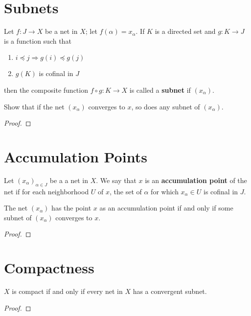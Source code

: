 \documentclass[12pt]{article}
\begin{document}
\section{Subnets}
\begin{defn}
	Let $f: J \to X$ be a net in $X$; let $f(\alpha) = x_\alpha$. If $K$ is a directed set and $g:K
		\to J$ is a function such that
	\begin{enumerate}
		\item $i \preceq j \Rightarrow g(i) \preceq g(j)$
		\item $g(K)$ is cofinal in $J$
	\end{enumerate}
	then the composite function $f \circ g : K \to X$ is called a \textbf{subnet} if $(x_\alpha)$.
\end{defn}

Show that if the net $(x_\alpha)$ converges to $x$, so does any subnet of $(x_\alpha)$.
\begin{proof}
\end{proof}

\section{Accumulation Points}
\begin{defn}
	Let ${(x_\alpha)}_{\alpha\in J}$ be a a net in $X$. We say that $x$ is an \textbf{accumulation
		point} of the net if for each neighborhood $U$ of $x$, the set of $\alpha$ for which $x_\alpha \in
		U$ is cofinal in $J$.
\end{defn}

\begin{lemma}
	The net $(x_\alpha)$ has the point $x$ as an accumulation point if and only if some subnet of
	$(x_\alpha)$ converges to $x$.
\end{lemma}
\begin{proof}
\end{proof}

\section{Compactness}
\begin{thm}
	$X$ is compact if and only if every net in $X$ has a convergent subnet.
\end{thm}
\begin{proof}
\end{proof}
\end{document}

